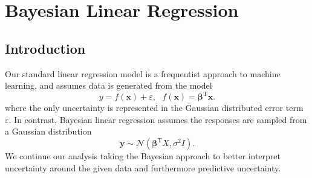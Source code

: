 \documentclass[10pt,a4paper]{article}
\numberwithin{equation}{section}
\theoremstyle{plain}
\theoremstyle{definition}
\theoremstyle{own}
\begin{document}
\section{Bayesian Linear Regression}
\subsection{Introduction}
Our standard linear regression model is a frequentist approach to machine learning, and assumes data is generated from the model
\begin{equation}
y = f(\mathbf{x}) + \varepsilon,~~~ f(\mathbf{x}) = \boldsymbol\beta^{\text{T}}\mathbf{x}.
\end{equation}
where the only uncertainty is represented in the Gaussian distributed error term $\varepsilon$. In contrast, Bayesian linear regression assumes the responses are sampled from a Gaussian distribution
\begin{equation}
\mathbf{y} \sim \mathcal{N}(\boldsymbol\beta^{\text{T}}X, \sigma^2 I).
\end{equation}
We continue our analysis taking the Bayesian approach to better interpret uncertainty around the given data and furthermore predictive uncertainty.
\end{document}
